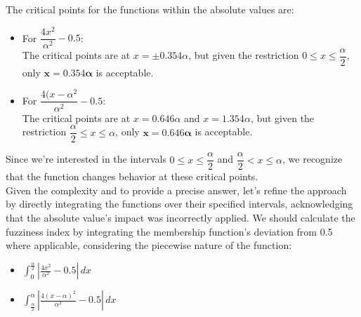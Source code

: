 The critical points for the functions within the absolute values are:
\begin{itemize}
	\item For $\dfrac{4x^2}{\alpha^2} - 0.5$:\\
		The critical points are at $x = \pm 0.354\alpha$, but given the restriction $0 \leq x \leq \dfrac{\alpha}{2}$, only $\mathbf{x = 0.354\alpha}$ is acceptable.
	
	\item  For $\dfrac{4(x-\alpha^2}{\alpha^2} - 0.5$:\\
		The critical points are at $x = 0.646\alpha$ and $x = 1.354\alpha$, but given the restriction $\dfrac{\alpha}{2} \leq x \leq \alpha$, only $\mathbf{x = 0.646\alpha}$ is acceptable.
\end{itemize}
Since we're interested in the intervals $0 \leq x \leq \dfrac{\alpha}{2}$ and $\dfrac{\alpha}{2} < x \leq \alpha$, we recognize that the function changes behavior at these critical points. \\
Given the complexity and to provide a precise answer, let's refine the approach by directly integrating the functions over their specified intervals, acknowledging that the absolute value's impact was incorrectly applied. We should calculate the fuzziness index by integrating the membership function's deviation from 0.5 where applicable, considering the piecewise nature of the function:
\begin{itemize}
	\item $\int_{0}^{\frac{\alpha}{2}} \left| \frac{4x^2}{\alpha^2} - 0.5 \right| \, dx$
	\item $\int_{\frac{\alpha}{2}}^{\alpha} \left| \frac{4(x-\alpha)^2}{\alpha^2} - 0.5 \right| \, dx$
	
\end{itemize}
